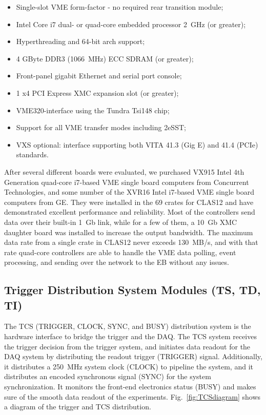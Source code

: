 \begin{itemize}
	\item Single-slot VME form-factor - no required rear transition module;
	\item Intel Core i7 dual- or quad-core embedded processor 2~GHz (or greater);
	\item Hyperthreading and 64-bit arch support;
	\item 4 GByte DDR3 (1066~MHz) ECC SDRAM (or greater);
	\item Front-panel gigabit Ethernet and serial port console;
	\item 1 x4 PCI Express XMC expansion slot (or greater);
	\item VME320-interface using the Tundra Tsi148 chip;
	\item Support for all VME transfer modes including 2eSST;
	\item VXS optional: interface supporting both VITA 41.3 (Gig E) and 41.4 (PCIe) standards.
\end{itemize}

After several different boards were evaluated, we purchased VX915 Intel 4th Generation quad-core i7-based VME single board computers from Concurrent Technologies, and some number of the XVR16 Intel i7-based VME single board computers from GE. They were installed in the 69 crates for CLAS12 and have demonstrated excellent performance and reliability. Most of the controllers send data over their built-in 1~Gb link, while for a few of them, a 10~Gb XMC daughter board was installed to increase the output bandwidth. The maximum data rate from a single crate in CLAS12 never exceeds 130~MB/s, and with that rate quad-core controllers are able to handle the VME data polling, event processing, and sending over the network to the EB without any issues. 


\subsection{Trigger Distribution System Modules (TS, TD, TI)}
	
The TCS (TRIGGER, CLOCK, SYNC, and BUSY) distribution system \cite{tcs-ref} is the hardware interface to bridge the trigger and the DAQ.  The TCS system receives the trigger decision from the trigger system, and initiates data readout for the DAQ system by distributing the readout trigger (TRIGGER) signal.  Additionally, it distributes a 250~MHz system clock (CLOCK) to pipeline the system, and it distributes an encoded synchronous signal (SYNC) for the system synchronization.  It monitors the front-end electronics status (BUSY) and makes sure of the smooth data readout of the experiments. Fig.~\ref{fig:TCSdiagram} shows a diagram of the trigger and TCS distribution.

